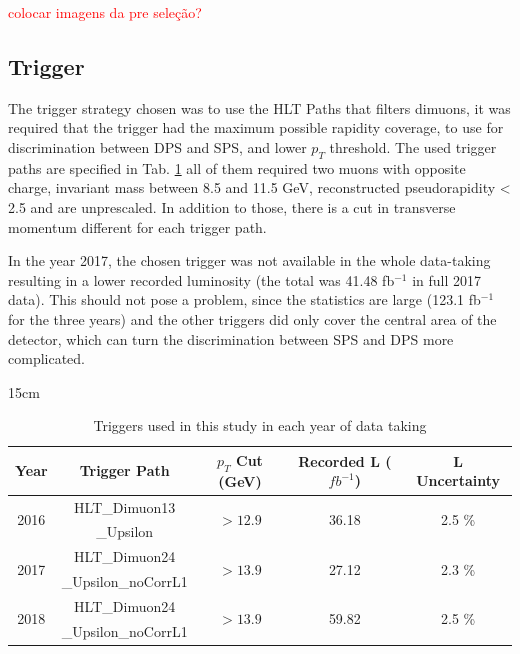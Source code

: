 \textcolor{red}{colocar imagens da pre seleção?}

\subsection{Trigger}\label{sec:trigger}

The trigger strategy chosen was to use the HLT Paths that filters dimuons, it was required that the trigger had the maximum possible rapidity coverage, to use for discrimination between DPS and SPS, and lower $p_T$ threshold. The used trigger paths are specified in Tab. \ref{tab:triggers} all of them required two muons with opposite charge, invariant mass between 8.5 and 11.5 GeV, reconstructed pseudorapidity < 2.5 and are unprescaled. In addition to those, there is a cut in transverse momentum different for each trigger path.

In the year 2017, the chosen trigger was not available in the whole data-taking resulting in a lower recorded luminosity (the total was 41.48 fb$^{-1}$ in full 2017 data). This should not pose a problem, since the statistics are large (123.1 fb$^{-1}$ for the three years) and the other triggers did only cover the central area of the detector, which can turn the discrimination between SPS and DPS more complicated. 

\begin{table}[!htbp]{15cm}
  \caption{Triggers used in this study in each year of data taking}
  \begin{tabular}{ c | c | c | c | c }
    Year & Trigger Path & $p_T$ Cut (GeV) & Recorded L ($fb^{-1}$) & L Uncertainty \\  \hline
    \multirow[c]{2}{*}{2016} & HLT\_Dimuon13 & \multirow[c]{2}{*}{$>12.9$} & \multirow[c]{2}{*}{36.18} & \multirow[c]{2}{*}{2.5 \%} \\
    & \_Upsilon & & \\ \hline
    \multirow[c]{2}{*}{2017} & HLT\_Dimuon24 & \multirow[c]{2}{*}{$>13.9$} & \multirow[c]{2}{*}{27.12} & \multirow[c]{2}{*}{2.3 \%} \\ 
    & \_Upsilon\_noCorrL1 & & & \\ \hline
    \multirow[c]{2}{*}{2018} & HLT\_Dimuon24 & \multirow[c]{2}{*}{$>13.9$} & \multirow[c]{2}{*}{59.82} & \multirow[c]{2}{*}{2.5 \%} \\
    & \_Upsilon\_noCorrL1 & & & \\ \hline
  \end{tabular}
  \label{tab:triggers}
\end{table}

